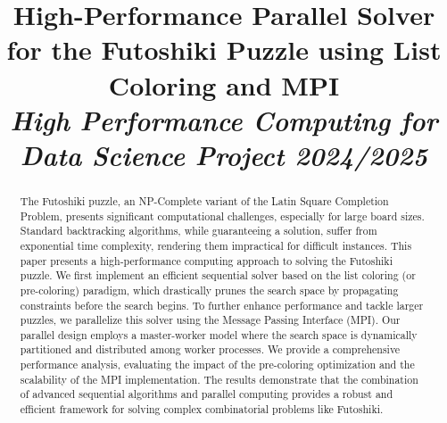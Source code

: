 \documentclass[10pt, conference]{IEEEtran}
\begin{document}
\title{High-Performance Parallel Solver for the Futoshiki Puzzle using List Coloring and MPI\\
\normalsize \textit{High Performance Computing for Data Science Project 2024/2025}
}


\author{
\and
{}
\and
{}
}

\maketitle

\begin{abstract}
The Futoshiki puzzle, an NP-Complete variant of the Latin Square Completion Problem, presents significant computational challenges, especially for large board sizes. Standard backtracking algorithms, while guaranteeing a solution, suffer from exponential time complexity, rendering them impractical for difficult instances. This paper presents a high-performance computing approach to solving the Futoshiki puzzle. We first implement an efficient sequential solver based on the list coloring (or pre-coloring) paradigm, which drastically prunes the search space by propagating constraints before the search begins. To further enhance performance and tackle larger puzzles, we parallelize this solver using the Message Passing Interface (MPI). Our parallel design employs a master-worker model where the search space is dynamically partitioned and distributed among worker processes. We provide a comprehensive performance analysis, evaluating the impact of the pre-coloring optimization and the scalability of the MPI implementation. The results demonstrate that the combination of advanced sequential algorithms and parallel computing provides a robust and efficient framework for solving complex combinatorial problems like Futoshiki.
\end{abstract}
\end{document}
